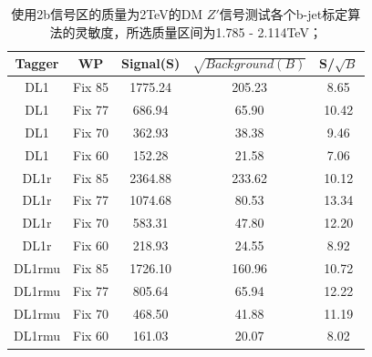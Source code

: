 \begin{table}[ht]
	\begin{center}
		\begin{tabular}{|c|c|c|c|c|}\hline
			Tagger       & WP          & Signal(S)    & $\sqrt{Background(B)}$    & S/$\sqrt{B}$ \\
			\hline
			DL1          & Fix 85      & 1775.24     & 205.23        & 8.65        \\
			DL1          & Fix 77      & 686.94      & 65.90         & 10.42        \\
			DL1          & Fix 70      & 362.93      & 38.38         & 9.46        \\
			DL1          & Fix 60      & 152.28      & 21.58         & 7.06        \\
			\hline
			DL1r          & Fix 85      & 2364.88      & 233.62       & 10.12        \\
			DL1r          & Fix 77      & 1074.68      & 80.53        & 13.34        \\
			DL1r          & Fix 70      & 583.31       & 47.80        & 12.20        \\
			DL1r          & Fix 60      & 218.93       & 24.55        & 8.92        \\
			\hline
			DL1rmu          & Fix 85      & 1726.10     & 160.96       & 10.72        \\
			DL1rmu          & Fix 77      & 805.64      & 65.94        & 12.22        \\
			DL1rmu          & Fix 70      & 468.50      & 41.88        & 11.19        \\
			DL1rmu          & Fix 60      & 161.03      & 20.07        & 8.02        \\
			\hline
		\end{tabular}
	\end{center}
	\caption{使用2b信号区的质量为2TeV的DM $Z\prime$信号测试各个b-jet标定算法的灵敏度，所选质量区间为1.785 - 2.114TeV；	}
	\label{tab:SenZ2TeV}
\end{table}

